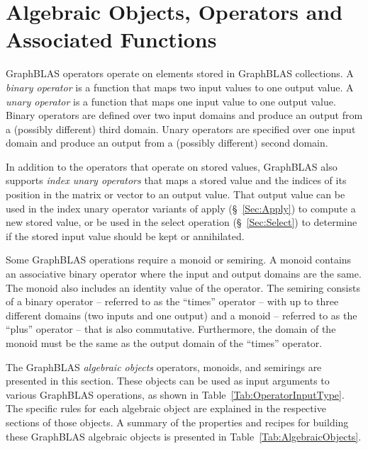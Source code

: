 \section{Algebraic Objects, Operators and Associated Functions}

GraphBLAS operators operate on elements stored in GraphBLAS collections. A 
\emph{binary operator} is a function that maps two input values to one 
output value. A \emph{unary operator} is a function that maps one input value 
to one output value.  Binary operators are defined over two input domains
and produce an output from a (possibly different) third domain. Unary
operators are specified over one input domain and produce an output from a
(possibly different) second domain.

In addition to the operators that operate on stored values, GraphBLAS
also supports \emph{index unary operators} that maps a stored value and 
the indices of its position in the matrix or vector to an output value.
That output value can be used in the index unary operator variants of {\sf apply} (\S~\ref{Sec:Apply}) 
to compute a new stored value, or be used in the {\sf select} operation (\S~\ref{Sec:Select}) to 
determine if the stored input value should be kept or annihilated.

Some GraphBLAS operations require a monoid or semiring.  A monoid contains an associative 
binary operator where the input and output domains are
the same. The monoid also includes an identity value of the operator.
The semiring consists of a binary operator -- referred to as the ``times'' 
operator -- with up to three different domains (two inputs
and one output) and a monoid -- referred to as the ``plus'' operator -- that
is also commutative.  Furthermore, the domain
of the monoid must be the same as the output domain of the ``times'' operator.

The GraphBLAS \emph{algebraic objects} operators, monoids, and semirings
are presented in this section.
These objects can be used as input arguments to various GraphBLAS
operations, as shown in Table~\ref{Tab:OperatorInputType}.
The specific rules for each algebraic object
are explained in the respective sections of those objects.  A summary
of the properties and recipes for building these GraphBLAS algebraic
objects is presented in Table~\ref{Tab:AlgebraicObjects}.

